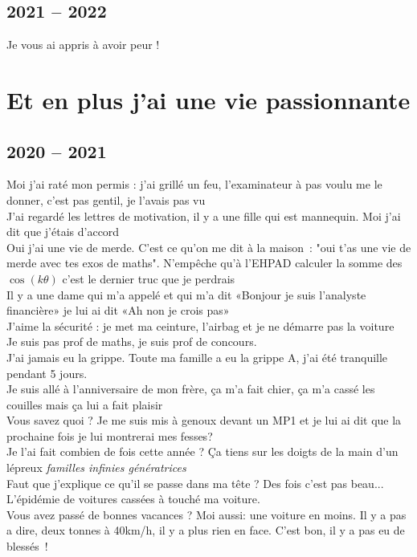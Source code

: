 \documentclass[french, a4paper, openany]{book}
\begin{document}
\section{2021 -- 2022}

	\noindent \og Je vous ai appris à avoir peur ! \fg \\

\chapter{Et en plus j'ai une vie passionnante}

\section{2020 -- 2021}

	\noindent \og Moi j'ai raté mon permis : j'ai grillé un feu, l'examinateur à pas voulu me le donner, c'est pas gentil, je l'avais pas vu \fg \\
	\og J'ai regardé les lettres de motivation, il y a une fille qui est mannequin. Moi j'ai dit que j'étais d'accord \fg \\
	\og Oui j'ai une vie de merde. C'est ce qu'on me dit à la maison~: "oui t'as une vie de merde avec tes exos de maths". N'empêche qu'à l'EHPAD calculer la somme des $\cos(k \theta)$ c'est le dernier truc que je perdrais \fg \\
	\og Il y a une dame qui m'a appelé et qui m'a dit «Bonjour je suis l'analyste financière» je lui ai dit «Ah non je crois pas» \fg \\
	\og J'aime la sécurité : je met ma ceinture, l'airbag et je ne démarre pas la voiture \fg \\
	\og Je suis pas prof de maths, je suis prof de concours. \fg \\
	\og J'ai jamais eu la grippe. Toute ma famille a eu la grippe A, j'ai été tranquille pendant 5 jours. \fg \\
	\og Je suis allé à l'anniversaire de mon frère, ça m'a fait chier, ça m'a cassé les couilles mais ça lui a fait plaisir \fg \\
	\og Vous savez quoi ? Je me suis mis à genoux devant un MP1 et je lui ai dit que la prochaine fois je lui montrerai mes fesses? \fg \\
	\og Je l'ai fait combien de fois cette année ? Ça tiens sur les doigts de la main d'un lépreux \fg \emph{familles infinies génératrices} \\
	\og Faut que j'explique ce qu'il se passe dans ma tête ? Des fois c'est pas beau... \fg \\
	\og L'épidémie de voitures cassées à touché ma voiture. \fg \\
	\og Vous avez passé de bonnes vacances ? Moi aussi: une voiture en moins. Il y a pas a dire, deux tonnes à 40km/h, il y a plus rien en face. C'est bon, il y a pas eu de blessés~! \fg \\
\end{document}
